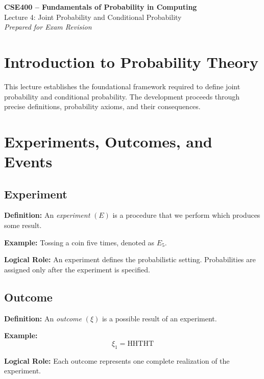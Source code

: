 \documentclass[12pt,a4paper]{article}
\begin{document}
\begin{center}
    {\Large \textbf{CSE400 -- Fundamentals of Probability in Computing}}\\[4pt]
    {\large Lecture 4: Joint Probability and Conditional Probability}\\[6pt]
    \textit{Prepared for Exam Revision}
\end{center}

\vspace{1em}

\section{Introduction to Probability Theory}

This lecture establishes the foundational framework required to define joint probability and conditional probability. The development proceeds through precise definitions, probability axioms, and their consequences.

\section{Experiments, Outcomes, and Events}

\subsection{Experiment}

\textbf{Definition:}  
An \textit{experiment} $(E)$ is a procedure that we perform which produces some result.

\textbf{Example:}  
Tossing a coin five times, denoted as $E_5$.

\textbf{Logical Role:}  
An experiment defines the probabilistic setting. Probabilities are assigned only after the experiment is specified.

\subsection{Outcome}

\textbf{Definition:}  
An \textit{outcome} $(\xi)$ is a possible result of an experiment.

\textbf{Example:}
\[
\xi_1 = \text{HHTHT}
\]

\textbf{Logical Role:}  
Each outcome represents one complete realization of the experiment.
\end{document}
